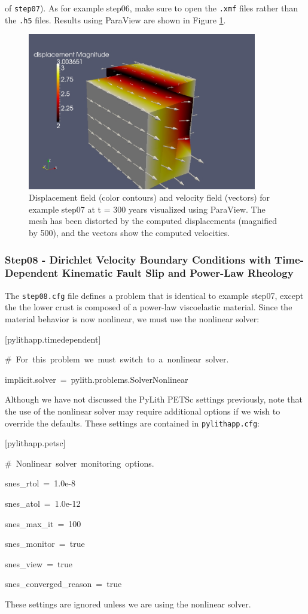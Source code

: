 of \texttt{step07}). As for example step06, make sure to open the
\texttt{.xmf} files rather than the \texttt{.h5} files. Results using
ParaView are shown in Figure \ref{fig:step07-displ-vel-t300}.
\begin{figure}
\centering{}\includegraphics[width=10cm]{tutorials/3dhex8/figs/step07-displ-vel-t300}\caption{Displacement field (color contours) and velocity field (vectors) for
example step07 at t = 300 years visualized using ParaView. The mesh
has been distorted by the computed displacements (magnified by 500),
and the vectors show the computed velocities.\label{fig:step07-displ-vel-t300}}
\end{figure}



\subsubsection{Step08 - Dirichlet Velocity Boundary Conditions with Time-Dependent
Kinematic Fault Slip and Power-Law Rheology\label{sub:Tutorial-Step08-Power-law}}

The \texttt{step08.cfg} file defines a problem that is identical to
example step07, except the the lower crust is composed of a power-law
viscoelastic material. Since the material behavior is now nonlinear,
we must use the nonlinear solver:
\begin{lyxcode}
{[}pylithapp.timedependent{]}

\#~For~this~problem~we~must~switch~to~a~nonlinear~solver.

implicit.solver~=~pylith.problems.SolverNonlinear
\end{lyxcode}
Although we have not discussed the PyLith PETSc settings previously,
note that the use of the nonlinear solver may require additional options
if we wish to override the defaults. These settings are contained
in \texttt{pylithapp.cfg}:
\begin{lyxcode}
{[}pylithapp.petsc{]}

\#~Nonlinear~solver~monitoring~options.

snes\_rtol~=~1.0e-8

snes\_atol~=~1.0e-12

snes\_max\_it~=~100

snes\_monitor~=~true

snes\_view~=~true

snes\_converged\_reason~=~true
\end{lyxcode}
These settings are ignored unless we are using the nonlinear solver.

